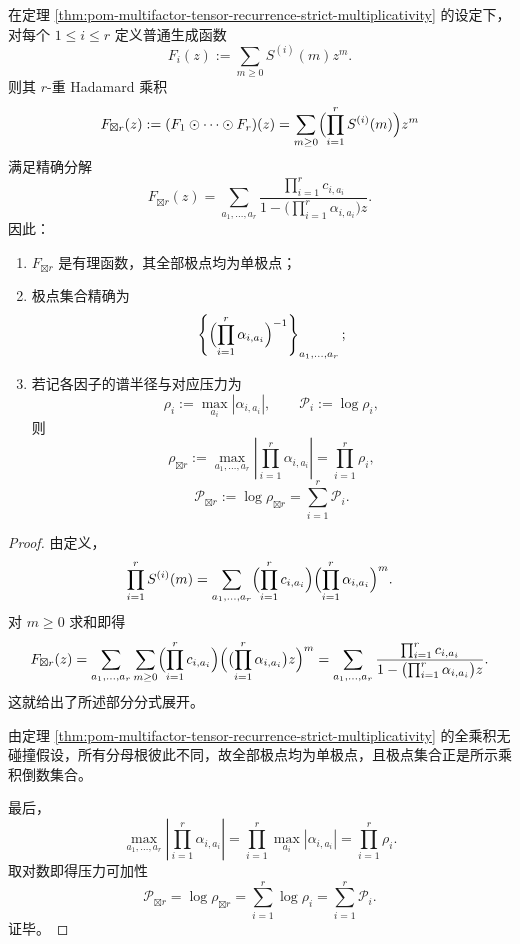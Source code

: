 \begin{theorem}\label{thm:pom-tensor-hadamard-pole-law-pressure-additivity}
在定理 \ref{thm:pom-multifactor-tensor-recurrence-strict-multiplicativity} 的设定下，对每个 \(1\le i\le r\) 定义普通生成函数
\[
F_i(z):=\sum_{m\ge 0}S^{(i)}(m)z^m.
\]
则其 \(r\)-重 Hadamard 乘积
\[
F_{\boxtimes r}(z):=(F_1\odot\cdots\odot F_r)(z)
=
\sum_{m\ge 0}\Bigl(\prod_{i=1}^{r}S^{(i)}(m)\Bigr)z^m
\]
满足精确分解
\[
F_{\boxtimes r}(z)
=
\sum_{a_1,\dots,a_r}
\frac{\prod_{i=1}^{r}c_{i,a_i}}
{1-\bigl(\prod_{i=1}^{r}\alpha_{i,a_i}\bigr)z}.
\]
因此：
\begin{enumerate}
  \item \(F_{\boxtimes r}\) 是有理函数，其全部极点均为单极点；
  \item 极点集合精确为
  \[
  \left\{
  \Bigl(\prod_{i=1}^{r}\alpha_{i,a_i}\Bigr)^{-1}
  \right\}_{a_1,\dots,a_r};
  \]
  \item 若记各因子的谱半径与对应压力为
  \[
  \rho_i:=\max_{a_i}|\alpha_{i,a_i}|,
  \qquad
  \mathcal P_i:=\log \rho_i,
  \]
  则
  \[
  \rho_{\boxtimes r}
  :=
  \max_{a_1,\dots,a_r}
  \left|
  \prod_{i=1}^{r}\alpha_{i,a_i}
  \right|
  =
  \prod_{i=1}^{r}\rho_i,
  \]
  \[
  \mathcal P_{\boxtimes r}
  :=
  \log \rho_{\boxtimes r}
  =
  \sum_{i=1}^{r}\mathcal P_i.
  \]
\end{enumerate}
\end{theorem}
\begin{proof}
由定义，
\[
\prod_{i=1}^{r}S^{(i)}(m)
=
\sum_{a_1,\dots,a_r}
\Bigl(\prod_{i=1}^{r}c_{i,a_i}\Bigr)
\Bigl(\prod_{i=1}^{r}\alpha_{i,a_i}\Bigr)^m.
\]
对 \(m\ge 0\) 求和即得
\[
F_{\boxtimes r}(z)
=
\sum_{a_1,\dots,a_r}\sum_{m\ge 0}
\Bigl(\prod_{i=1}^{r}c_{i,a_i}\Bigr)
\Bigl(\bigl(\prod_{i=1}^{r}\alpha_{i,a_i}\bigr)z\Bigr)^m
=
\sum_{a_1,\dots,a_r}
\frac{\prod_{i=1}^{r}c_{i,a_i}}
{1-\bigl(\prod_{i=1}^{r}\alpha_{i,a_i}\bigr)z}.
\]
这就给出了所述部分分式展开。

由定理 \ref{thm:pom-multifactor-tensor-recurrence-strict-multiplicativity} 的全乘积无碰撞假设，所有分母根彼此不同，故全部极点均为单极点，且极点集合正是所示乘积倒数集合。

最后，
\[
\max_{a_1,\dots,a_r}
\left|
\prod_{i=1}^{r}\alpha_{i,a_i}
\right|
=
\prod_{i=1}^{r}\max_{a_i}|\alpha_{i,a_i}|
=
\prod_{i=1}^{r}\rho_i.
\]
取对数即得压力可加性
\[
\mathcal P_{\boxtimes r}
=
\log \rho_{\boxtimes r}
=
\sum_{i=1}^{r}\log \rho_i
=
\sum_{i=1}^{r}\mathcal P_i.
\]
证毕。
\end{proof}

